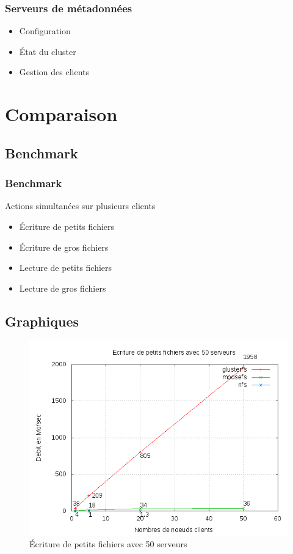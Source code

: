 \documentclass[blue]{beamer}
\begin{document}
        \begin{frame}
                \frametitle{Serveurs de métadonnées}
                \begin{itemize}
                        \item Configuration
                        \item État du cluster
                        \item Gestion des clients
                \end{itemize}
        \end{frame}

\section{Comparaison}
	\subsection{Benchmark}
		\begin{frame}
		\frametitle{Benchmark}
			Actions simultanées sur plusieurs clients
			\begin{itemize}
				\item Écriture de petits fichiers
				\item Écriture de gros fichiers
				\item Lecture de petits fichiers
				\item Lecture de gros fichiers
			\end{itemize}
		\end{frame}

	\subsection{Graphiques}
		\begin{frame}
			\begin{figure}
				\includegraphics[width=0.75\linewidth]{../images/srv50ws2.png}
				\caption{Écriture de petits fichiers avec 50 serveurs}
			\end{figure}
		\end{frame}
\end{document}
